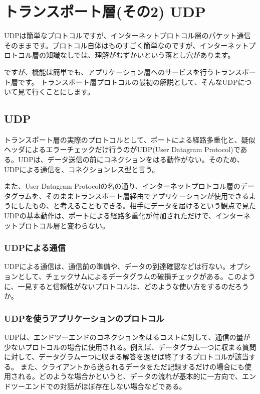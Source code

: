 \chapter{トランスポート層(その2) UDP}

UDPは簡単なプロトコルですが、インターネットプロトコル層のパケット通信そのままです。プロトコル自体はものすごく簡単なのですが、インターネットプロトコル層の知識なしでは、理解がむずかいという落とし穴があります。

ですが、機能は簡単でも、アプリケーション層へのサービスを行うトランスポート層です。
トランスポート層プロトコルの最初の解説として、そんなUDPについて見て行くことにします。

\section{UDP}

トランスポート層の実際のプロトコルとして、ポートによる経路多重化と、疑似ヘッダによるエラーチェックだけ行うのがUDP(User Datagram Protocol)である。UDPは、データ送信の前にコネクションをはる動作がない。そのため、UDPによる通信を、コネクションレス型と言う。

また、User Datagram Protocolの名の通り、インターネットプロトコル層のデータグラムを、そのままトランスポート層経由でアプリケーションが使用できるようにしたもの、と考えることもできる。相手にデータを届けるという観点で見たUDPの基本動作は、ポートによる経路多重化が付加されただけで、インターネットプロトコル層と変わらない。

\subsection{UDPによる通信}

UDPによる通信は、通信前の準備や、データの到達確認などは行ない。オプションとして、チェックサムによるデータグラムの破損チェックがある。このように、一見すると信頼性がないプロトコルは、どのような使い方をするのだろうか。

\subsection{UDPを使うアプリケーションのプロトコル}

UDPは、エンドツーエンドのコネクションをはるコストに対して、通信の量が少ないプロトコルの場合に使用される。例えば、データグラム一つに収まる質問に対して、データグラム一つに収まる解答を返せば終了するプロトコルが該当する。
また、クライアントから送られるデータをただ記録するだけの場合にも使用される。どのような場合かというと、データの流れが基本的に一方向で、エンドツーエンドでの対話がほぼ存在しない場合などである。

